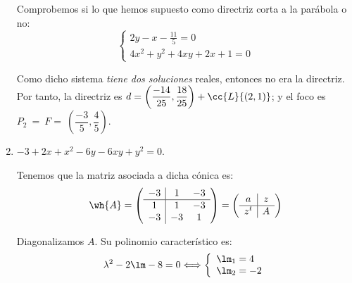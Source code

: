 \begin{ejercicio}
\begin{enumerate}
        Comprobemos si lo que hemos supuesto como directriz corta a la parábola o no:
        \begin{equation*}
            \left\{
            \begin{array}{l}
                2y-x-\frac{11}{5}=0 \\
                4x^2+y^2+4xy+2x+1=0
            \end{array}
            \right.
        \end{equation*}
    
        Como dicho sistema \emph{tiene dos soluciones} reales, entonces no era la directriz. Por tanto, la directriz es $d=\left(\dfrac{-14}{25},\dfrac{18}{25}\right)+\cc{L}\{(2,1)\}$; y el foco es $P_2~=~F=~\left(\dfrac{-3}{5},\dfrac{4}{5}\right)$.
    
        \item $-3+2x+x^2-6y-6xy+y^2=0$.
            
        Tenemos que la matriz asociada a dicha cónica es:
        \begin{equation*}
            \wh{A} = \left(\begin{array}{c|cc}
                -3 & 1 & -3  \\ \hline
                1 & 1 & -3 \\
                -3 &  -3 & 1
            \end{array}\right)
            = \left(\begin{array}{c|c}
                a & z \\ \hline
                z^t & A
            \end{array}\right)
        \end{equation*}
        
        Diagonalizamos $A$. Su polinomio característico es:
        \begin{equation*}
            \lambda^2 -2\lm -8 = 0 \Longleftrightarrow \left\{\begin{array}{l}
                    \lm_1 = 4\\
                    \lm_2 = -2
                \end{array}\right.
        \end{equation*}
    

\end{enumerate}
\end{ejercicio}
